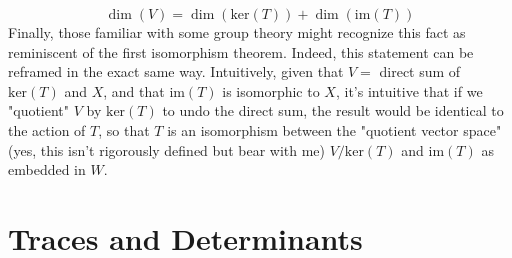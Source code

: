 \documentclass{article}
\begin{document}
\begin{adjustwidth}{1cm}{1cm}
		$$ \dim(V) = \dim(\text{ker}(T)) + \dim(\text{im}(T)) $$
	Finally, those familiar with some group theory might recognize this fact as reminiscent of the first isomorphism theorem. Indeed, this statement can be reframed in the exact same way. Intuitively, given that $ V = $ direct sum of $ \text{ker}(T) $ and $ X $, and that $ \text{im}(T) $ is isomorphic to $ X $, it's intuitive that if we "quotient" $ V $ by $ \text{ker}(T) $ to undo the direct sum, the result would be identical to the action of $ T $, so that $ T $ is an isomorphism between the "quotient vector space" (yes, this isn't rigorously defined but bear with me) $ V / \text{ker}(T) $ and $ \text{im}(T) $ as embedded in $ W $.

\end{adjustwidth}

\section{Traces and Determinants}
\end{document}
